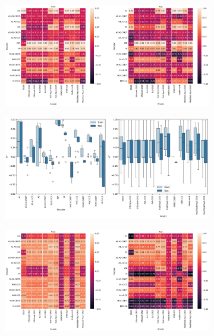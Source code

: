\documentclass[journal=jacsat,manuscript=article]{achemso}
\begin{document}
\begin{figure}[H]
	\centering
	\begin{subfigure}[b]{0.49\textwidth}
		\centering
		\includegraphics[width=\textwidth]{../images/Function_Fitting/sixteenqubit/linear_heatplots.png}
		\caption{}
		\label{fig:sixteenlinear_heatplots}
	\end{subfigure}
	\hfill
	\begin{subfigure}[b]{0.49\textwidth}
		\centering
		\includegraphics[width=\textwidth]{../images/Function_Fitting/sixteenqubit/linear_boxplots.png}
		\caption{}
		\label{fig:sixteenlinear_boxplots}
	\end{subfigure}
	\hfill	
	\begin{subfigure}[b]{0.49\textwidth}
		\centering
		\includegraphics[width=\textwidth]{../images/Function_Fitting/sixteenqubit/quadratic_heatplots.png}

\end{subfigure}
\end{figure}
\end{document}
